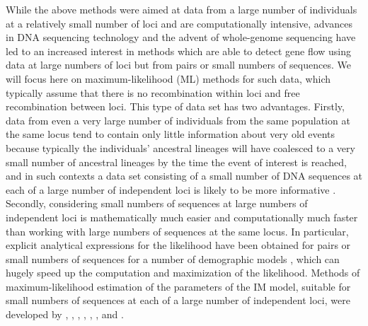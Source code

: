 \documentclass[11pt]{article}
\begin{document}
While the above methods were aimed at data from a large number of individuals at a relatively small number of loci and are computationally intensive, 
advances in DNA sequencing technology and the advent of whole-genome sequencing have led to an increased interest in methods 
which are able to detect gene flow using data at large numbers of loci but from pairs or small numbers of sequences.
We will focus here on maximum-likelihood (ML) methods for such data, which typically assume that there is no recombination within loci and free recombination between loci.
This type of data set has two advantages. Firstly, data from even a very large number of individuals from the same population at the same 
locus tend to contain only little information about very old 
events 
because typically the individuals' ancestral lineages will have coalesced to a very small number of ancestral lineages 
by the time the event of interest is reached, and in such contexts a data set consisting of a small number of DNA sequences at each of a 
large number of independent loci is likely to be more informative \citep{Maddison2006, Wang2010, Lohse2010, Lohse2011}. 
Secondly, considering small numbers of sequences at large numbers of 
independent loci is mathematically much easier and computationally much
faster than working with large numbers of sequences at the same locus. 
In particular, explicit analytical expressions for the likelihood have been 
obtained for pairs or small numbers of sequences for a number of demographic 
models \citep[for example,][]{Takahata1995, Herbots2008, Hobolth2011, Lohse2011, Herbots2012, Zhu2012, Andersen2014, Lohse2014, Lohse2016, Costa2017, Dalquen2017}, which can hugely
speed up the computation and maximization of the likelihood. 
Methods of maximum-likelihood estimation of the parameters of the IM model, suitable for small numbers of sequences at each of a large number of independent loci, were developed by \citet{Herbots2008}, \citet{Wang2010}, \citet{Hobolth2011}, \citet{Lohse2011}, \citet{Zhu2012}, \citet{Andersen2014}, and \citet{Dalquen2017}.
\end{document}

